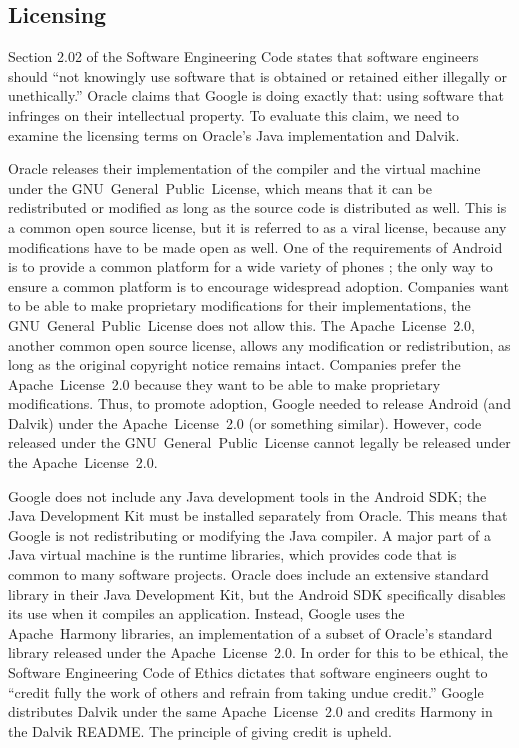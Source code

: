 \documentclass[11pt]{article}
\begin{document}
\begin{multicols}{2}
\subsection{Licensing} %
\label{sub:licensing}

Section 2.02 of the Software Engineering Code states that software engineers
should ``not knowingly use software that is obtained or retained either
illegally or unethically.'' \cite[\S 2.02]{secode}  Oracle claims that Google is
doing exactly that: using software that infringes on their intellectual
property.  To evaluate this claim, we need to examine the licensing terms on
Oracle's Java implementation and Dalvik.

Oracle releases their implementation of the compiler and the virtual machine
under the GNU~General~Public~License, which means that it can be redistributed
or modified as long as the source code is distributed as well.  This is a common
open source license, but it is referred to as a viral license, because any
modifications have to be made open as well.  One of the requirements of Android
is to provide a common platform for a wide variety of phones
\cite{open-handset-alliance-ann}; the only way to ensure a common platform is to
encourage widespread adoption.  Companies want to be able to make proprietary
modifications for their implementations, the GNU~General~Public~License does not
allow this.  The Apache~License~2.0, another common open source license, allows
any modification or redistribution, as long as the original copyright notice
remains intact.  Companies prefer the Apache~License~2.0 because they want to be
able to make proprietary modifications.  \cite{why-apache2-license}  Thus, to
promote adoption, Google needed to release Android (and Dalvik) under the
Apache~License~2.0 (or something similar).  However, code released under the
GNU~General~Public~License cannot legally be released under the
Apache~License~2.0.

Google does not include any Java development tools in the Android SDK; the Java
Development Kit must be installed separately from Oracle.  This means that
Google is not redistributing or modifying the Java compiler.  A major part of a
Java virtual machine is the runtime libraries, which provides code that is
common to many software projects.  Oracle does include an extensive standard
library in their Java Development Kit, but the Android SDK specifically disables
its use when it compiles an application.  Instead, Google uses the
Apache~Harmony libraries, an implementation of a subset of Oracle's standard
library released under the Apache~License~2.0.  In order for this to be ethical,
the Software Engineering Code of Ethics dictates that software engineers ought
to ``credit fully the work of others and refrain from taking undue credit.''
\cite[\S 7.03]{secode}  Google distributes Dalvik under the same
Apache~License~2.0 and credits Harmony in the Dalvik README.
\cite{dalvik-readme}  The principle of giving credit is upheld.


\end{multicols}
\end{document}
